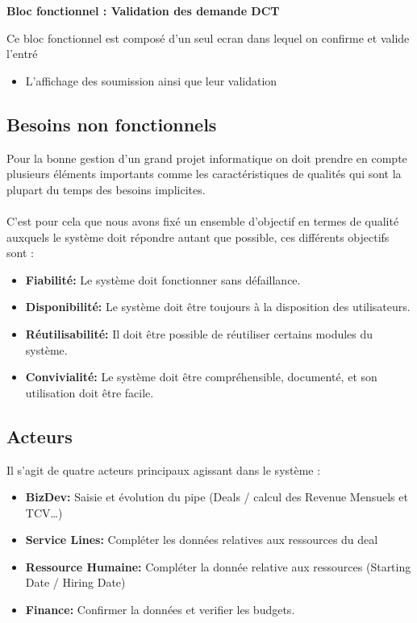 \vspace{0.5cm}
\textbf{\color{red}Bloc fonctionnel : Validation des demande DCT}
    
Ce bloc fonctionnel est composé d'un seul ecran dans lequel on confirme et valide l'entré
\begin{itemize}
    \item L’affichage des soumission ainsi que leur validation
\end{itemize}

\subsection{Besoins non fonctionnels}

Pour la bonne gestion d'un grand projet informatique on doit prendre en compte plusieurs éléments importants comme les caractéristiques de qualités qui sont la plupart du temps des besoins implicites.
\\\\
C'est pour cela que nous avons fixé un ensemble d'objectif en termes de qualité auxquels le système doit répondre autant que possible, ces différents objectifs sont :
\\
\begin{itemize}
    \item \textbf{Fiabilité:} Le système doit fonctionner sans défaillance.
    \item \textbf{Disponibilité:} Le système doit être toujours à la disposition des utilisateurs.
    \item \textbf{Réutilisabilité:} Il doit être possible de réutiliser certains modules du
système.
    \item \textbf{Convivialité:} Le système doit être compréhensible, documenté, et son
utilisation doit être facile.
\end{itemize}

\subsection{Acteurs}
Il s’agit de quatre acteurs principaux agissant dans le système :
\\
\begin{itemize}
    \item \textbf{BizDev:} Saisie et évolution du pipe (Deals / calcul des Revenue Mensuels
et TCV…)
    \item \textbf{Service Lines:} Compléter les données relatives aux ressources du deal 
    \item \textbf{Ressource Humaine:} Compléter la donnée relative aux ressources (Starting Date / Hiring
Date)
    \item \textbf{Finance:} Confirmer la données et verifier les budgets.
\end{itemize}


